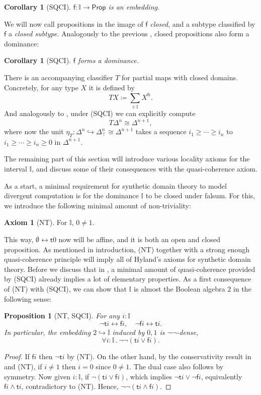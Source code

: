 \documentclass[a4paper,12pt]{amsart}
\newtheorem{corollary}[theorem]{Corollary}
\newtheorem{proposition}[theorem]{Proposition}
\theoremstyle{definition}
\newtheorem*{axiom}{Axiom}
\newcommand{\mbb}[1]{\mathbb{#1}}
\newcommand{\I}{\mbb I}
\newcommand{\ms}[1]{\mathsf{#1}}
\newcommand{\hook}{\hookrightarrow}
\newcommand{\dneg}{\neg\neg}
\newcommand{\cprt}{_{\top}}
\newcommand{\fa}[2]{\forall #1\!\colon\!\!#2\mathpunct{.}}
\newcommand{\emp}{\emptyset}
\newcommand{\eq}{\leftrightarrow}
\newcommand{\pp}{\ms{Prop}}
\begin{document}
\begin{corollary}[SQCI]
  $\ms f \colon \I \to \pp$ is an embedding.
\end{corollary}

We will now call propositions in the image of $\ms f$ \emph{closed}, and a subtype classified by $\ms f$ a \emph{closed subtype}. Analogously to the previous , closed propositions also form a dominance:

\begin{corollary}[SQCI]\label{cor:dualisdominance}
  $\ms f$ forms a dominance.
\end{corollary}

There is an accompanying classifier $T$ for partial maps with closed domains. Concretely, for any type $X$ it is defined by
\[ T X \coloneq \sum_{i:\I} X^{\ms fi}. \]
And analogously to , under (SQCI) we can explicitly compute 
\[ T\Delta^n \cong \Delta^{n+1}, \]
where now the unit $\eta_T \colon \Delta^n \hook \Delta^n\cprt \cong \Delta^{n+1}$ takes a sequence $i_1 \ge \cdots \ge i_n$ to $i_1 \ge \cdots \ge i_n \ge 0$ in $\Delta^{n+1}$. 

The remaining part of this section will introduce various locality axioms for the interval $\I$, and discuss some of their consequences with the quasi-coherence axiom.

As a start, a minimal requirement for synthetic domain theory to model divergent computation is for the dominance $\I$ to be closed under falsum. For this, we introduce the following minimal amount of non-triviality:

\begin{axiom}[NT]\label{ax:nt}
  For $\I$, $0 \neq 1$.
\end{axiom}

This way, $\emp \eq \ms t0$ now will be affine, and it is both an open and closed proposition. As mentioned in introduction, (NT) together with a strong enough quasi-coherence principle will imply all of Hyland's axioms for synthetic domain theory. Before we discuss that in , a minimal amount of quasi-coherence provided by (SQCI) already implies a lot of elementary properties. As a first consequence of (NT) with (SQCI), we can show that $\I$ is almost the Boolean algebra $2$ in the following sense:

\begin{proposition}[NT, SQCI]\label{prop:filed}
  For any $i : \I$ 
  \[ \neg \ms ti \eq \ms fi, \quad \neg\ms fi \eq \ms ti. \]
  In particular, the embedding $2 \hook \I$ induced by $0,1$ is $\neg\neg$-dense,
  \[ \fa i\I \dneg(\ms ti \vee \ms fi). \]
\end{proposition}
\begin{proof}
  If $\ms fi$ then $\neg\ms ti$ by (NT). On the other hand, by the conservativity result in  and (NT), if $i \neq 1$ then $i = 0$ since $0 \neq 1$. The dual case also follows by symmetry. Now given $i :\I$, if $\neg(\ms ti \vee \ms fi)$, which implies $\neg\ms ti \vee \neg\ms fi$, equivalently $\ms fi \wedge \ms ti$, contradictory to (NT). Hence, $\neg\neg(\ms ti \wedge \ms fi)$.
\end{proof}
\end{document}
